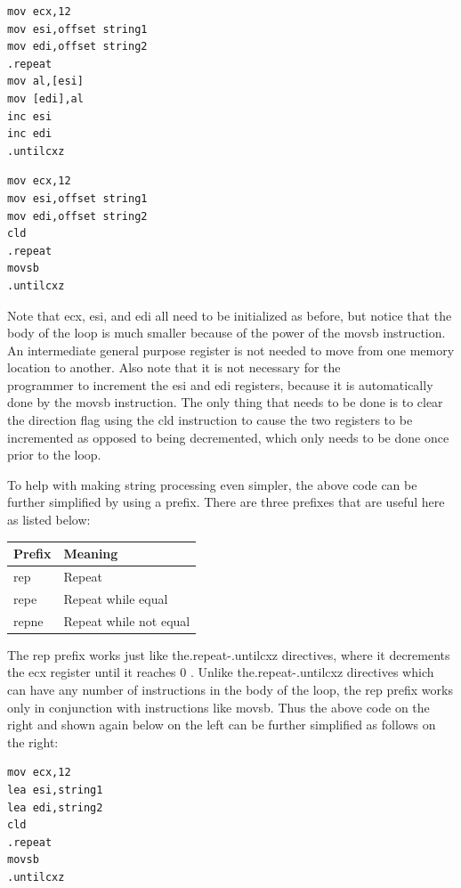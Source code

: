 \documentclass[10pt]{book}
\begin{document}
\begin{verbatim}
mov ecx,12
mov esi,offset string1
mov edi,offset string2
.repeat
mov al,[esi]
mov [edi],al
inc esi
inc edi
.untilcxz
\end{verbatim}

\begin{verbatim}
mov ecx,12
mov esi,offset string1
mov edi,offset string2
cld
.repeat
movsb
.untilcxz
\end{verbatim}

Note that ecx, esi, and edi all need to be initialized as before, but notice that the body of the loop is much smaller because of the power of the movsb instruction. An intermediate general purpose register is not needed to move from one memory location to another. Also note that it is not necessary for the\\
programmer to increment the esi and edi registers, because it is automatically done by the movsb instruction. The only thing that needs to be done is to clear the direction flag using the cld instruction to cause the two registers to be incremented as opposed to being decremented, which only needs to be done once prior to the loop.

To help with making string processing even simpler, the above code can be further simplified by using a prefix. There are three prefixes that are useful here as listed below:

\begin{center}
\begin{tabular}{|l|l|}
\hline
Prefix & Meaning \\
\hline
rep & Repeat \\
\hline
repe & Repeat while equal \\
\hline
repne & Repeat while not equal \\
\hline
\end{tabular}
\end{center}

The rep prefix works just like the.repeat-.untilcxz directives, where it decrements the ecx register until it reaches 0 . Unlike the.repeat-.untilcxz directives which can have any number of instructions in the body of the loop, the rep prefix works only in conjunction with instructions like movsb. Thus the above code on the right and shown again below on the left can be further simplified as follows on the right:

\begin{verbatim}
mov ecx,12
lea esi,string1
lea edi,string2
cld
.repeat
movsb
.untilcxz
\end{verbatim}
\end{document}
